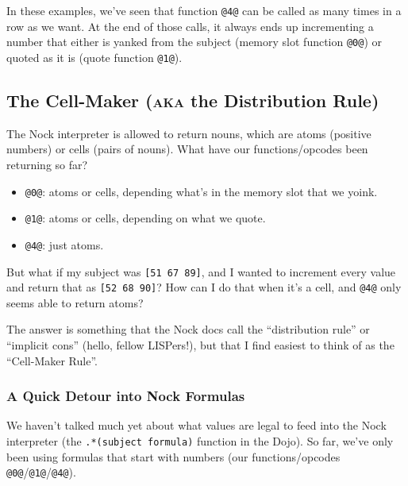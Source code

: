 \documentclass[twoside]{article}
\begin{document}
In these examples, we've seen that function \lstinline[style=inlinecode]{@4@} can be called as many times in a row as we want. At the end of those calls, it always ends up incrementing a number that either is yanked from the subject (memory slot function \lstinline[style=inlinecode]{@0@}) or quoted as it is (quote function \lstinline[style=inlinecode]{@1@}).

\subsection{The Cell-Maker (\textsc{aka} the Distribution Rule)}
\label{sxn:nockdist}

The Nock interpreter is allowed to return nouns, which are atoms (positive numbers) or cells (pairs of nouns). What have our functions/opcodes been returning so far?

\begin{itemize}
  \item  \lstinline[style=inlinecode]{@0@}: atoms or cells, depending what's in the memory slot that we yoink.
  \item  \lstinline[style=inlinecode]{@1@}: atoms or cells, depending on what we quote.
  \item  \lstinline[style=inlinecode]{@4@}: just atoms.
\end{itemize}

But what if my subject was \lstinline[style=inlinecode]{[51 67 89]}, and I wanted to increment every value and return that as \lstinline[style=inlinecode]{[52 68 90]}? How can I do that when it's a cell, and \lstinline[style=inlinecode]{@4@} only seems able to return atoms?

The answer is something that the Nock docs call the “distribution rule” or “implicit cons” (hello, fellow LISPers!), but that I find easiest to think of as the “Cell-Maker Rule”.

\subsubsection{A Quick Detour into Nock Formulas}

We haven't talked much yet about what values are legal to feed into the Nock interpreter (the \lstinline[style=inlinecode]{.*(subject formula)} function in the Dojo). So far, we've only been using formulas that start with numbers (our functions/opcodes \lstinline[style=inlinecode]{@0@}/\lstinline[style=inlinecode]{@1@}/\lstinline[style=inlinecode]{@4@}).
\end{document}
